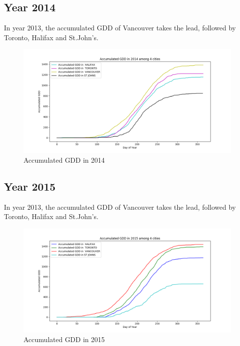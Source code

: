 \documentclass[12pt]{article}
\begin{document}
\subsection{Year 2014}

In year 2013, the accumulated GDD of Vancouver takes the lead, followed by Toronto, Halifax and St.John's.
\begin{figure}[H]
\includegraphics[width=5.25in]{Plot/accGDD_2014.png}



\caption{Accumulated GDD in 2014}
\label{5.2}
\end{figure}

\subsection{Year 2015}
In year 2013, the accumulated GDD of Vancouver takes the lead, followed by Toronto, Halifax and St.John's.
\begin{figure}[H]
\includegraphics[width=5.25in]{Plot/accGDD_2015.png}



\caption{Accumulated GDD in 2015}
\label{5.3}
\end{figure}
\end{document}
